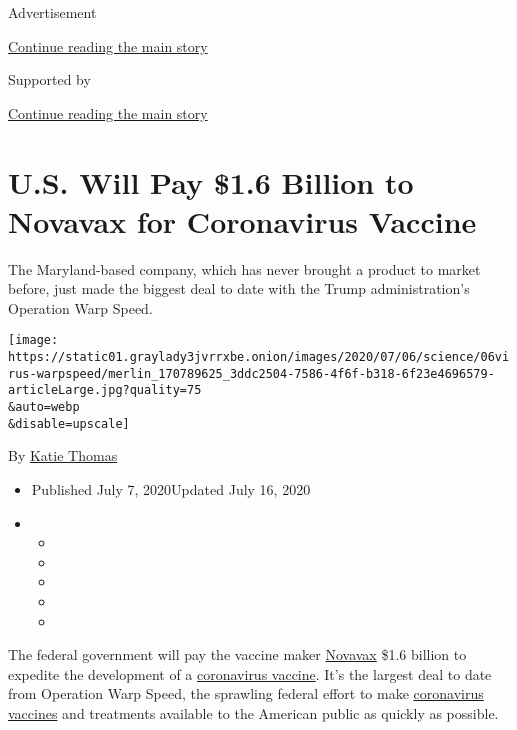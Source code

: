 Advertisement

\protect\hyperlink{after-top}{Continue reading the main story}

Supported by

\protect\hyperlink{after-sponsor}{Continue reading the main story}

\hypertarget{us-will-pay-16-billion-to-novavax-for-coronavirus-vaccine}{%
\section{U.S. Will Pay \$1.6 Billion to Novavax for Coronavirus
Vaccine}\label{us-will-pay-16-billion-to-novavax-for-coronavirus-vaccine}}

The Maryland-based company, which has never brought a product to market
before, just made the biggest deal to date with the Trump
administration's Operation Warp Speed.

\texttt{[image: https://static01.graylady3jvrrxbe.onion/images/2020/07/06/science/06virus-warpspeed/merlin\_170789625\_3ddc2504-7586-4f6f-b318-6f23e4696579-articleLarge.jpg?quality=75\\\&auto=webp\\\&disable=upscale]}

By \href{https://www.nytimes3xbfgragh.onion/by/katie-thomas}{Katie
Thomas}

\begin{itemize}
\item
  Published July 7, 2020Updated July 16, 2020
\item
  \begin{itemize}
  \item
  \item
  \item
  \item
  \item
  \end{itemize}
\end{itemize}

The federal government will pay the vaccine maker
\href{https://www.nytimes3xbfgragh.onion/2020/07/16/health/coronavirus-vaccine-novavax.html}{Novavax}
\$1.6 billion to expedite the development of a
\href{https://www.nytimes3xbfgragh.onion/interactive/2020/science/coronavirus-vaccine-tracker.html}{coronavirus
vaccine}. It's the largest deal to date from Operation Warp Speed, the
sprawling federal effort to make
\href{https://www.nytimes3xbfgragh.onion/2020/07/16/health/coronavirus-vaccine-novavax.html}{coronavirus
vaccines} and treatments available to the American public as quickly as
possible.

